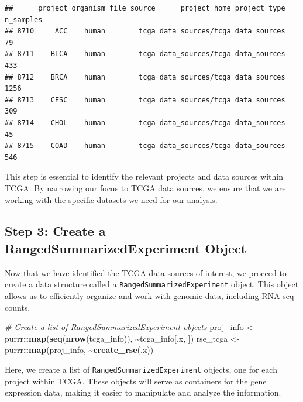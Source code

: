 \documentclass[
]{book}
\newenvironment{Shaded}{\begin{snugshade}}{\end{snugshade}}
\newcommand{\CommentTok}[1]{\textcolor[rgb]{0.56,0.35,0.01}{\textit{#1}}}
\newcommand{\FunctionTok}[1]{\textcolor[rgb]{0.13,0.29,0.53}{\textbf{#1}}}
\newcommand{\NormalTok}[1]{#1}
\newcommand{\OtherTok}[1]{\textcolor[rgb]{0.56,0.35,0.01}{#1}}
\newcommand{\SpecialCharTok}[1]{\textcolor[rgb]{0.81,0.36,0.00}{\textbf{#1}}}
\begin{document}
\begin{verbatim}
##      project organism file_source      project_home project_type n_samples
## 8710     ACC    human        tcga data_sources/tcga data_sources        79
## 8711    BLCA    human        tcga data_sources/tcga data_sources       433
## 8712    BRCA    human        tcga data_sources/tcga data_sources      1256
## 8713    CESC    human        tcga data_sources/tcga data_sources       309
## 8714    CHOL    human        tcga data_sources/tcga data_sources        45
## 8715    COAD    human        tcga data_sources/tcga data_sources       546
\end{verbatim}

This step is essential to identify the relevant projects and data sources within TCGA. By narrowing our focus to TCGA data sources, we ensure that we are working with the specific datasets we need for our analysis.

\hypertarget{step-3-create-a-rangedsummarizedexperiment-object}{%
\subsection{Step 3: Create a RangedSummarizedExperiment Object}\label{step-3-create-a-rangedsummarizedexperiment-object}}

Now that we have identified the TCGA data sources of interest, we proceed to create a data structure called a \href{https://www.bioconductor.org/packages/devel/bioc/vignettes/SummarizedExperiment/inst/doc/SummarizedExperiment.html}{\texttt{RangedSummarizedExperiment}} object. This object allows us to efficiently organize and work with genomic data, including RNA-seq counts.

\begin{Shaded}
\begin{Highlighting}[]
\CommentTok{\# Create a list of RangedSummarizedExperiment objects}
\NormalTok{proj\_info }\OtherTok{\textless{}{-}}\NormalTok{ purrr}\SpecialCharTok{::}\FunctionTok{map}\NormalTok{(}\FunctionTok{seq}\NormalTok{(}\FunctionTok{nrow}\NormalTok{(tcga\_info)), }\SpecialCharTok{\textasciitilde{}}\NormalTok{tcga\_info[.x, ])}
\NormalTok{rse\_tcga }\OtherTok{\textless{}{-}}\NormalTok{ purrr}\SpecialCharTok{::}\FunctionTok{map}\NormalTok{(proj\_info, }\SpecialCharTok{\textasciitilde{}}\FunctionTok{create\_rse}\NormalTok{(.x))}
\end{Highlighting}
\end{Shaded}

Here, we create a list of \texttt{RangedSummarizedExperiment} objects, one for each project within TCGA. These objects will serve as containers for the gene expression data, making it easier to manipulate and analyze the information.
\end{document}
